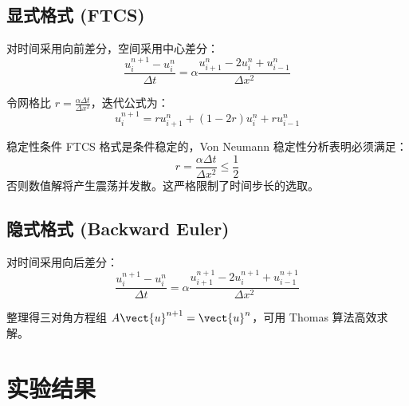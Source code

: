 \documentclass[linux, report,review]{mindflow}
\begin{document}
\subsection{显式格式 (FTCS)}

\begin{center}
\end{center}

对时间采用向前差分，空间采用中心差分：
\[
    \frac{u_i^{n+1} - u_i^n}{\Delta t} = \alpha \frac{u_{i+1}^n - 2u_i^n + u_{i-1}^n}{\Delta x^2}
\]

令网格比 $r = \frac{\alpha \Delta t}{\Delta x^2}$，迭代公式为：
\[
    u_i^{n+1} = r u_{i+1}^n + (1 - 2r) u_i^n + r u_{i-1}^n
\]

\begin{warning}{稳定性条件}
    FTCS 格式是条件稳定的，Von Neumann 稳定性分析表明必须满足：
    \[
        r = \frac{\alpha \Delta t}{\Delta x^2} \le \frac{1}{2}
    \]
    否则数值解将产生震荡并发散。这严格限制了时间步长的选取。
\end{warning}

\subsection{隐式格式 (Backward Euler)}


对时间采用向后差分：
\[
    \frac{u_i^{n+1} - u_i^n}{\Delta t} = \alpha \frac{u_{i+1}^{n+1} - 2u_i^{n+1} + u_{i-1}^{n+1}}{\Delta x^2}
\]

整理得三对角方程组 $A \vect{u}^{n+1} = \vect{u}^n$，可用 Thomas 算法高效求解。

\section{实验结果}
\end{document}
